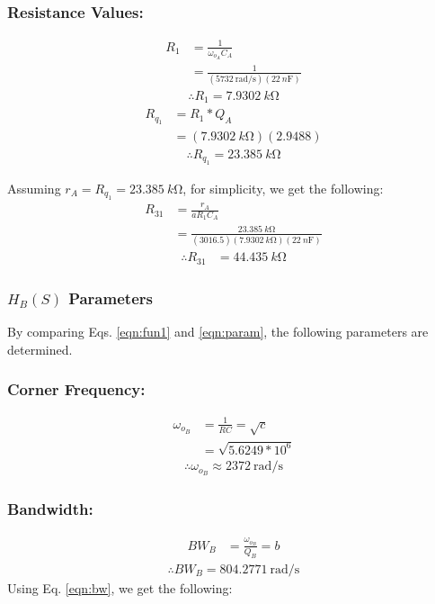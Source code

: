 \documentclass[hidelinks]{article}
\begin{document}
	\subsubsection*{Resistance Values:}
	\begin{align}
	R_1 &= \frac{1}{\omega_{o_A} C_A}\\
	&= \frac{1}{(\SI{5732}{\radian/\second}) (\SI{22}{n\farad})} \nonumber
	\end{align}
	\begin{align*}
	\therefore R_{1} = \SI{7.9302}{k\ohm}	
	\end{align*}
	\begin{align}
	R_{q_1} &= R_1* Q_A\\
	&= (\SI{7.9302}{k\ohm}) (2.9488) \nonumber
	\end{align}
	\begin{align*}
	\therefore R_{q_1} = \SI{23.385}{k\ohm}		
	\end{align*}
	
	\pagebreak
	\noindent Assuming $r_A = R_{q_1} = \SI{23.385}{k\ohm}$, for simplicity, we get the following:
	\begin{align}
	R_{31} &= \frac{r_A}{a R_1 C_A}\\
	&= \frac{\SI{23.385}{k\ohm}}{(3016.5) (\SI{7.9302}{k\ohm}) (\SI{22}{n\farad})} \nonumber
	\end{align}
	\begin{align*}
	\therefore R_{31} &= \SI{44.435}{k\ohm}
	\end{align*}	
	
	
	
	\pagebreak
	\subsubsection{$H_B(S)$ Parameters}
	By comparing Eqs. \ref{eqn:fun1} and \ref{eqn:param}, the following parameters are determined.
	\subsubsection*{Corner Frequency:}
	\begin{align}
		\omega_{o_B} &= \frac{1}{RC} = \sqrt{c}\\
		&= \sqrt{5.6249 * 10 ^{6}} \nonumber
	\end{align}
	\begin{align*}
		\therefore \omega_{o_B} \approx \SI{2372}{\radian/\second}
	\end{align*}
	\subsubsection*{Bandwidth:}
	\begin{align}
		\label{eqn:bw}
		BW_B &= \frac{\omega_{o_B}}{Q_B} = b
	\end{align}
	\begin{align*}
		\therefore BW_B = \SI{804.2771}{\radian/\second}
	\end{align*}
	Using Eq. \ref{eqn:bw}, we get the following:
\end{document}
